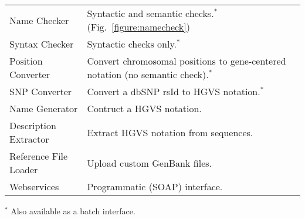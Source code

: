 \documentclass[final, slidestop]{beamer}
\begin{document}
\begin{frame}{}
\begin{myPoster}
{      \begin{tabular}{l@{\ \ --\ \ }p{25cm}}
        Name Checker          & Syntactic and semantic checks.$^*$
                               (Fig.~\ref{figure:namecheck}) \\
        Syntax Checker        & Syntactic checks only.$^*$ \\
        Position Converter    & Convert chromosomal positions to gene-centered
                               notation (no semantic check).$^*$ \\
        SNP Converter         & Convert a dbSNP rsId to HGVS notation.$^*$ \\
        Name Generator        & Contruct a HGVS notation. \\
        Description Extractor & Extract HGVS notation from sequences. \\
        Reference File Loader & Upload custom GenBank files. \\
        Webservices           & Programmatic (SOAP) interface. \\
      \end{tabular}
      \bigskip

      $^*$ {\small Also available as a batch interface.}
    }
  \end{myPoster}
\end{frame}
\end{document}

